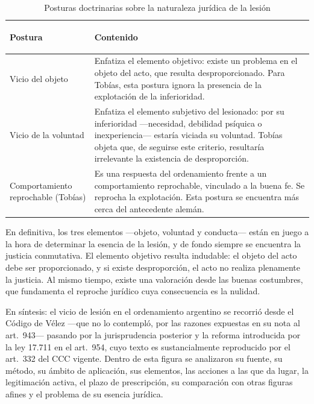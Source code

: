 \documentclass[12pt,oneside]{book}
\begin{document}
\begin{table}[H]
\centering
\caption{Posturas doctrinarias sobre la naturaleza jurídica de la lesión}
\begin{tabularx}{\textwidth}{>{\bfseries\raggedright\arraybackslash}p{} X}
\toprule
\textbf{Postura} & \textbf{Contenido} \\
\midrule
Vicio del objeto & Enfatiza el elemento objetivo: existe un problema en el objeto del acto, que resulta desproporcionado. Para Tobías, esta postura ignora la presencia de la explotación de la inferioridad. \\
Vicio de la voluntad & Enfatiza el elemento subjetivo del lesionado: por su inferioridad —necesidad, debilidad psíquica o inexperiencia— estaría viciada su voluntad. Tobías objeta que, de seguirse este criterio, resultaría irrelevante la existencia de desproporción. \\
Comportamiento reprochable (Tobías) & Es una respuesta del ordenamiento frente a un comportamiento reprochable, vinculado a la buena fe. Se reprocha la explotación. Esta postura se encuentra más cerca del antecedente alemán. \\
\bottomrule
\end{tabularx}
\end{table}

En definitiva, los tres elementos —objeto, voluntad y conducta— están en juego a la hora de determinar la esencia de la lesión, y de fondo siempre se encuentra la justicia conmutativa. El elemento objetivo resulta indudable: el objeto del acto debe ser proporcionado, y si existe desproporción, el acto no realiza plenamente la justicia. Al mismo tiempo, existe una valoración desde las buenas costumbres, que fundamenta el reproche jurídico cuya consecuencia es la nulidad.

\begin{note}
En síntesis: el vicio de lesión en el ordenamiento argentino se recorrió desde el Código de Vélez —que no lo contempló, por las razones expuestas en su nota al art.\ 943— pasando por la jurisprudencia posterior y la reforma introducida por la ley 17.711 en el art.\ 954, cuyo texto es sustancialmente reproducido por el art.\ 332 del CCC vigente. Dentro de esta figura se analizaron su fuente, su método, su ámbito de aplicación, sus elementos, las acciones a las que da lugar, la legitimación activa, el plazo de prescripción, su comparación con otras figuras afines y el problema de su esencia jurídica.
\end{note}
\end{document}
